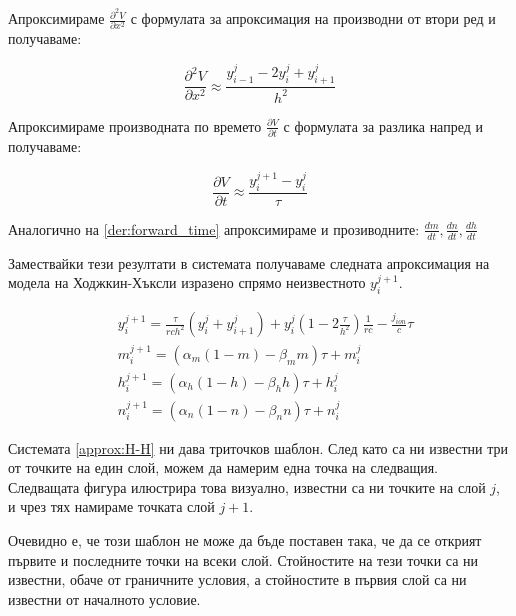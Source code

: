 \documentclass{article}
\numberwithin{equation}{section}
\begin{document}
    Апроксимираме $\frac{\partial^2 V}{\partial x^2}$ с формулата за апроксимация на производни от втори ред и получаваме:

    \begin{equation}\label{der:mid_space}
        \frac{\partial^2 V}{\partial x^2} \approx \frac{y_{i-1}^j - 2y_i^j + y_{i+1}^j}{h^2}
    \end{equation}
    
    Апроксимираме производната по времето $\frac{\partial V}{\partial t}$ с формулата за разлика напред и получаваме:

    \begin{equation}\label{der:forward_time}
        \frac{\partial V}{\partial t} \approx \frac{y_i^{j+1} - y_i^j}{\tau}
    \end{equation}

    Аналогично на \eqref{der:forward_time} апроксимираме и прозиводните: $\frac{dm}{dt}, \frac{dn}{dt}, \frac{dh}{dt}$

    Замествайки тези резултати в системата получаваме следната апроксимация на модела на Ходжкин-Хъксли изразено спрямо неизвестното
    $y_i^{j+1}$.

    \begin{equation}\label{approx:H-H}
        \begin{aligned}
            &y_i^{j+1} = \frac{\tau}{rch^2}\left(y_i^j +y_{i+1}^j\right) + y_i^j\left(1 - 2\frac{\tau}{h^2}\right)\frac{1}{rc}
            - \frac{j_{ion}}{c}\tau\\
            &m_i^{j+1} = \left(\alpha_m(1-m) - \beta_mm\right)\tau + m_i^j\\
            &h_i^{j+1} = \left(\alpha_h(1-h) - \beta_hh\right)\tau + h_i^j\\
            &n_i^{j+1} = \left(\alpha_n(1-n) - \beta_nn\right)\tau + n_i^j
    \end{aligned}
    \end{equation}

    Системата \eqref{approx:H-H} ни дава триточков шаблон. След като са ни известни три от точките на един слой, можем да намерим една точка
    на следващия. Следващата фигура илюстрира това визуално, известни са ни точките на слой $j$, и чрез тях намираме точката слой $j+1$.
    \begin{figure}[h!]
        \begin{center}
        
        \caption{}
        \end{center}
    \end{figure}

    Очевидно е, че този шаблон не може да бъде поставен така, че да се открият първите и последните точки на всеки слой. Стойностите на тези
    точки са ни известни, обаче от граничните условия, а стойностите в първия слой са ни известни от началното условие.
\end{document}
